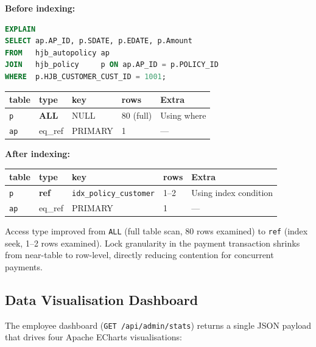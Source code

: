 \documentclass[12pt,letterpaper]{article}
\begin{document}
\textbf{Before indexing:}
\begin{lstlisting}[language=SQL,numbers=none]
EXPLAIN
SELECT ap.AP_ID, p.SDATE, p.EDATE, p.Amount
FROM   hjb_autopolicy ap
JOIN   hjb_policy     p ON ap.AP_ID = p.POLICY_ID
WHERE  p.HJB_CUSTOMER_CUST_ID = 1001;
\end{lstlisting}

\begin{table}[H]
\centering\small
\begin{tabular}{lllll}
\toprule
\textbf{table} & \textbf{type} & \textbf{key} & \textbf{rows} & \textbf{Extra} \\
\midrule
\texttt{p}  & \textbf{ALL} & NULL    & 80 (full)  & Using where \\
\texttt{ap} & eq\_ref      & PRIMARY & 1          & ---         \\
\bottomrule
\end{tabular}
\end{table}

\textbf{After indexing:}
\begin{table}[H]
\centering\small
\begin{tabular}{lllll}
\toprule
\textbf{table} & \textbf{type} & \textbf{key} & \textbf{rows} & \textbf{Extra} \\
\midrule
\texttt{p}  & \textbf{ref} & \texttt{idx\_policy\_customer} & 1--2 & Using index condition \\
\texttt{ap} & eq\_ref      & PRIMARY                       & 1    & ---                  \\
\bottomrule
\end{tabular}
\end{table}

Access type improved from \texttt{ALL} (full table scan, 80 rows examined) to \texttt{ref} (index seek, 1--2 rows examined). Lock granularity in the payment transaction shrinks from near-table to row-level, directly reducing contention for concurrent payments.

\subsection{Data Visualisation Dashboard}

The employee dashboard (\texttt{GET /api/admin/stats}) returns a single JSON payload that drives four Apache ECharts visualisations:
\end{document}
